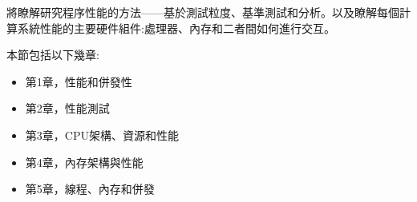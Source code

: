 將瞭解研究程序性能的方法——基於測試粒度、基準測試和分析。以及瞭解每個計算系統性能的主要硬件組件:處理器、內存和二者間如何進行交互。

本節包括以下幾章:

\begin{itemize}
\item 第1章，性能和併發性
\item 第2章，性能測試
\item 第3章，CPU架構、資源和性能
\item 第4章，內存架構與性能
\item 第5章，線程、內存和併發
\end{itemize}